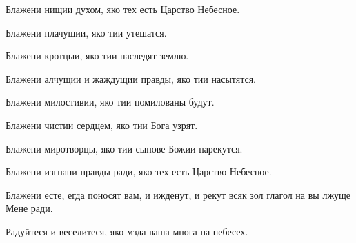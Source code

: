 \mychapterending

 


{\centering{}

}

Блажени нищии духом, яко тех есть Царство Небесное. 

Блажени плачущии, яко тии утешатся. 

Блажени кротцыи, яко тии наследят землю. 

Блажени алчущии и жаждущии правды, яко тии насытятся. 

Блажени милостивии, яко тии помилованы будут. 

Блажени чистии сердцем, яко тии Бога узрят. 

Блажени миротворцы, яко тии сынове Божии нарекутся. 

Блажени изгнани правды ради, яко тех есть Царство Небесное. 

Блажени есте, егда поносят вам, и ижденут, и рекут всяк зол глагол на вы лжуще Мене ради. 

Радуйтеся и веселитеся, яко мзда ваша многа на небесех. 

\mychapterending

 
\nopagebreak

